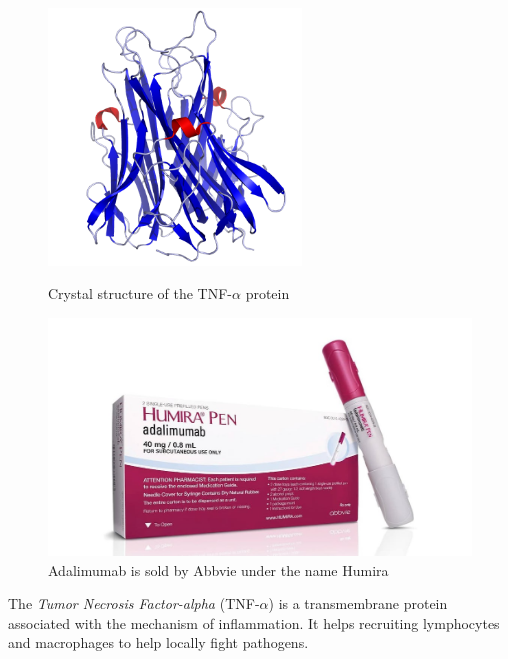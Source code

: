 \begin{figure}[H]
    \begin{minipage}{0.495\textwidth}
            \centering
            \includegraphics[width=0.6\textwidth]{../Images/TNFa_Crystal_Structure.rsh.png}
            \caption{Crystal structure of the TNF-$\alpha$ protein}
            \label{fig:TNFa_Crystal_Structure}
    \end{minipage}\hfill
    \begin{minipage}{0.495\textwidth}
            \centering
            \includegraphics[width=\textwidth]{../Images/humira.jpg}   
            \caption{Adalimumab is sold by Abbvie under the name Humira \cite{noauthor_humira_nodate-1}}
            \label{fig:humira}
    \end{minipage}
\end{figure}

The \emph{Tumor Necrosis Factor-alpha} (TNF-$\alpha$) is a transmembrane protein
associated with the mechanism of inflammation. It helps recruiting lymphocytes
and macrophages to help locally fight pathogens.

